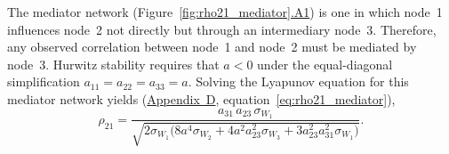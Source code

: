\documentclass[12pt]{article}
\begin{document}
The mediator network
(Figure~\ref{fig:rho21_mediator}\hyperref[fig:mediator_A1]{.A1})
is one in which node~1 influences node~2 not directly but
through an intermediary node~3.
Therefore, any observed correlation between node~1 and
node~2 must be mediated by node~3.
Hurwitz stability requires that $a<0$ under the equal-diagonal
simplification $a_{11}=a_{22}=a_{33}=a$.
Solving the Lyapunov equation for this mediator network yields
(\hyperref[app:appD]{Appendix~D},
equation~\ref{eq:rho21_mediator}),
\begin{equation}
\rho_{21} = \frac{
  a_{31}\,a_{23}\,\sigma_{W_1}
}{
  \sqrt{2\sigma_{W_1}
        \bigl(8a^4\sigma_{W_2}
              +4a^2 a_{23}^2\sigma_{W_3}
              +3a_{23}^2 a_{31}^2\sigma_{W_1}\bigr)}
}.
\label{eq:rho21_mediator_main}
\end{equation}
\end{document}
